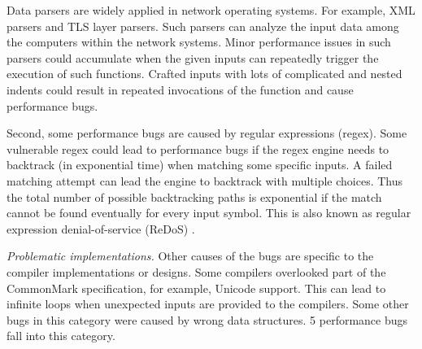 Data parsers are widely applied in network operating systems.
%
For example, XML parsers and TLS layer parsers.
%
Such parsers can analyze the input data among the computers within the network systems.
%
Minor performance issues in such parsers could accumulate when the given inputs can repeatedly trigger the execution of such functions.
%
%
%
%
Crafted inputs with lots of complicated and nested indents could result in repeated invocations of the function and cause performance bugs.
%
%

Second, some performance bugs are caused by regular expressions (regex).
%
Some vulnerable regex could lead to performance bugs if the regex engine needs to backtrack (in exponential time) when matching some specific inputs.
%
A failed matching attempt can lead the engine to backtrack with multiple choices.
%
Thus the total number of possible backtracking paths is exponential if the match cannot be found eventually for every input symbol.
%
This is also known as regular expression denial-of-service (ReDoS) \cite{freezing, shen2018rescue, redosimpact, wustholz2017static}.
%
%

 \emph{Problematic implementations.}
Other causes of the bugs are specific to the compiler implementations or designs.
%
Some compilers overlooked part of the CommonMark specification, for example, Unicode support.
%
This can lead to infinite loops when unexpected inputs are provided to the compilers.
%
Some other bugs in this category were caused by wrong data structures.
%
5 performance bugs fall into this category.

